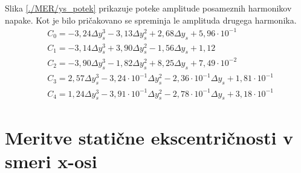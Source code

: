 Slika \ref{./MER/ys_potek} prikazuje poteke amplitude posameznih harmonikov napake. Kot je bilo pričakovano se spreminja le amplituda drugega harmonika. 
\begin{eqnarray}
&C_0 =-3,24\Delta y_s^{3}-3,13\Delta y_s^{2}+2,68\Delta y_s+5,96\cdot 10^{-1} \\                         
&C_1 =-3,14\Delta y_s^{3}+3,90\Delta y_s^{2}-1,56\Delta y_s+1,12 \\                                      
&C_2 =-3,90\Delta y_s^{3}-1,82\Delta y_s^{2}+8,25\Delta y_s+7,49\cdot 10^{-2} \\                         
&C_3 =2,57\Delta y_s^{3}-3,24\cdot 10^{-1}\Delta y_s^{2}-2,36\cdot 10^{-1}\Delta y_s+1,81\cdot 10^{-1} \\
&C_4 =1,24\Delta y_s^{3}-3,91\cdot 10^{-1}\Delta y_s^{2}-2,78\cdot 10^{-1}\Delta y_s+3,18\cdot 10^{-1}
\end{eqnarray}







\section{Meritve statične ekscentričnosti v smeri x-osi}
